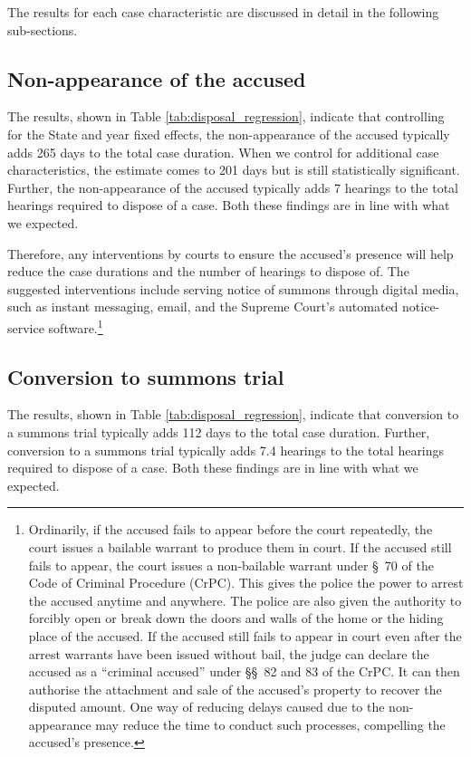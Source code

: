 \documentclass[12pt,a4paper]{article}
\begin{document}
The results for each case characteristic are discussed in detail in the following sub-sections.

\subsection{Non-appearance of the accused}
\label{sec:non-appe-accus-1}

The results, shown in Table \ref{tab:disposal_regression}, indicate that controlling for the State and year fixed effects, the non-appearance of the accused typically adds 265 days to the total case duration. When we control for additional case characteristics, the estimate comes to 201 days but is still statistically significant. Further, the non-appearance of the accused typically adds 7 hearings to the total hearings required to dispose of a case. Both these findings are in line with what we expected.

Therefore, any interventions by courts to ensure the accused's presence will help reduce the case durations and the number of hearings to dispose of. The suggested interventions include serving notice of summons through digital media, such as instant messaging, email, and the Supreme Court's automated notice-service software.\footnote{Ordinarily, if the accused fails to appear before the court repeatedly, the court issues a bailable warrant to produce them in court. If the accused still fails to appear, the court issues a non-bailable warrant under \S~70 of the Code of Criminal Procedure (CrPC). This gives the police the power to arrest the accused anytime and anywhere. The police are also given the authority to forcibly open or break down the doors and walls of the home or the hiding place of the accused. If the accused still fails to appear in court even after the arrest warrants have been issued without bail, the judge can declare the accused as a ``criminal accused'' under \S\S~82 and 83 of the CrPC. It can then authorise the attachment and sale of the accused's property to recover the disputed amount. One way of reducing delays caused due to the non-appearance may reduce the time to conduct such processes, compelling the accused's presence.}

\subsection{Conversion to summons trial}
\label{sec:conv -summ-trial-1}

The results, shown in Table \ref{tab:disposal_regression}, indicate that conversion to a summons trial typically adds 112 days to the total case duration. Further, conversion to a summons trial typically adds 7.4 hearings to the total hearings required to dispose of a case. Both these findings are in line with what we expected.
\end{document}
